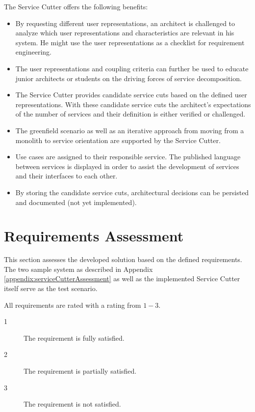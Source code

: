 The Service Cutter offers the following benefits:

\begin{itemize}
	\item By requesting different user representations, an architect is challenged to analyze which user representations and characteristics are relevant in his system. He might use the user representations as a checklist for requirement engineering.
	\item The user representations and coupling criteria can further be used to educate junior architects or students on the driving forces of service decomposition.
	\item The Service Cutter provides candidate service cuts based on the defined user representations. With these candidate service cuts the architect's expectations of the number of services and their definition is either verified or challenged. 
	\item The greenfield scenario as well as an iterative approach from moving from a monolith to service orientation are supported by the Service Cutter.
	\item Use cases are assigned to their responsible service. The published language between services is displayed in order to assist the development of services and their interfaces to each other.
	\item By storing the candidate service cuts, architectural decisions can be persisted and documented (not yet implemented).
\end{itemize}

\section{Requirements Assessment}

This section assesses the developed solution based on the defined requirements. The two sample system as described in Appendix \ref{appendix:serviceCutterAssessment} as well as the implemented Service Cutter itself serve as the test scenario.

All requirements are rated with a rating from $1-3$.

\begin{description}
\item[1] The requirement is fully satisfied.
\item[2] The requirement is partially satisfied.
\item[3] The requirement is not satisfied.
\end{description}
\clearpage
